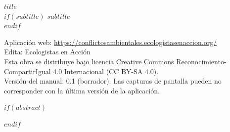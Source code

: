 \thispagestyle{empty}
\null\vfill
\noindent
{\sffamily\bfseries\large\color{eaVerdeOscuro} $title$}\\[0.2em]
$if(subtitle)$
{\sffamily\color{eaGris} $subtitle$}\\[1.2em]
$endif$
{\footnotesize\sffamily\color{eaGris}
\noindent Aplicación web: \url{https://conflictosambientales.ecologistasenaccion.org/}\\[0.4em]
\noindent Edita: Ecologistas en Acción\\[0.4em]
\noindent Esta obra se distribuye bajo licencia Creative Commons
Reconocimiento-CompartirIgual 4.0 Internacional (CC BY-SA 4.0).\\[0.4em]
\noindent Versión del manual: 0.1 (borrador). Las capturas de pantalla pueden
no corresponder con la última versión de la aplicación.\par}
\vspace{1.5cm}
\clearpage

$if(abstract)$
\begin{abstract}
$abstract$
\end{abstract}
$endif$
